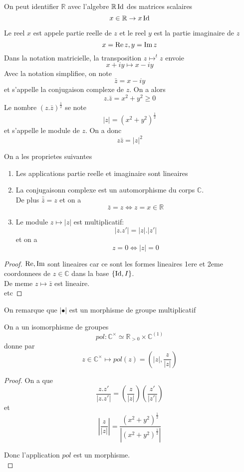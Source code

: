 \documentclass[../main.tex]{subfiles}
\begin{document}
\begin{rmq}
On peut identifier $\mathbb{R}$ avec l'algebre $\mathbb{R}\operatorname*{Id}$ des matrices scalaires
\[ 
x\in \mathbb{R}\to x \operatorname*{Id}
\]

\end{rmq}
\begin{defn}
Le reel $x$ est appele partie reelle de $z$ et le reel $y$ est la partie imaginaire de $z$ 
\[ 
x= \operatorname*{Re} z, y = \operatorname*{Im} z
\]
Dans la notation matricielle, la transposition $z \mapsto ^{t}z$ envoie
\[ 
x+iy \mapsto x-iy
\]
Avec la notation simplifiee, on note
\[ 
	\bar{z} = x-iy
\]
et s'appelle la conjugaison complexe de $z$. On a alors
\[ 
	z.\bar{z} = x^{2}+y^{2}\geq 0
\]
Le nombre $( z.\bar{z}) ^{\frac{1}{2}}$ se note
\[ 
	|z| = ( x^{2}+y^{2})^{\frac{1}{2}}
\]
et s'appelle le module de $z$. On a donc
\[ 
	z\bar{z} = |z|^{2}
\]

\end{defn}
\begin{propo}
On a les proprietes suivantes
\begin{enumerate}
\item Les applications partie reelle et imaginaire sont lineaires
\item La conjugaisonn complexe est un automorphisme du corps $\mathbb{C}$.\\
	De plus $\bar{\bar{z}} = z$ et on a 
	\[ 
		\bar{z} = z \iff z= x \in \mathbb{R}			
	\]

\item Le module $z \mapsto |z|$ est multiplicatif:
	\[ 
	|z.z'| = |z|.|z'|
	\]
	et on a 
	\[ 
	z=0 \iff |z| = 0
	\]
	
	
\end{enumerate}

\end{propo}
\begin{proof}
$\operatorname*{Re},\operatorname*{Im}$ sont lineaires car ce sont les formes lineaires 1ere et 2eme coordonnees de $z\in \mathbb{C}$ dans la base $ \left\{ \operatorname*{Id}, I \right\} $.\\
De meme $z \mapsto \bar{z}$ est lineaire.\\
etc
\end{proof}
On remarque que $|\bullet|$ est un morphisme de groupe multiplicatif

\begin{propo}
On a un isomorphisme de groupes
\[ 
	pol: \mathbb{C}^{\times}\simeq \mathbb{R}_{>0} \times \mathbb{C}^{( 1) }
\]
donne par
\[ 
	z \in \mathbb{C}^{\times} \mapsto pol( z)  = ( |z|, \frac{z}{|z|}) 
\]

\end{propo}
\begin{proof}
On a que
\[ 
	\frac{z.z'}{|z.z'|}= ( \frac{z}{|z|}) ( \frac{z'}{|z'|}) 
\]
et 
\[ 
	| \frac{z}{|z|}| = \frac{( x^{2}+y^{2})^{\frac{1}{2}} }{|( x^{2}+y^{2}) ^{\frac{1}{2}}|}
\]

Donc l'application $pol$ est un morphisme.\\

\end{proof}
\end{document}

